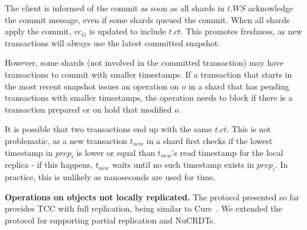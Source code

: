 \documentclass[sigplan,twocolumn,review,anonymous]{acmart}
\begin{document}
The client is informed of the commit as soon as all shards in $t.WS$ acknowledge the commit message, even if 
some shards queued the commit.
When all shards apply the commit, $\mathit{vc}_G$ is updated to include $t\!.\mathit{ct}$.
This promotes freshness, as new transactions will always use the latest committed snapshot.

However, some shards (not involved in the committed transaction) 
may have transactions to commit with smaller timestamps. 
If a transaction that starts in the most recent snapshot issues an operation on $o$ in a shard that has
pending transactions with smaller timestamps, the operation needs to block if there is a transaction prepared or on hold 
that modified $o$. 



It is possible that two transactions end up with the same $t\!.\mathit{ct}$.
This is not problematic, as a new transaction $\mathit{t}_\mathit{new}$  in a shard first checks if the lowest timestamp in $\mathit{prep}_i$ is lower or equal than $\mathit{t}_\mathit{new}$'s read timestamp for the local replica - if this happens, $\mathit{t}_\mathit{new}$ waits until no such timestamp exists in $\mathit{prep}_i$.
In practice, this is unlikely as nanoseconds are used for time. %


\noindent
\textbf{Operations on objects not locally replicated.}
The protocol presented so far provides TCC with full replication, being similar to Cure~\cite{cure}.
We extended the protocol for supporting partial replication and NuCRDTs.
\end{document}
